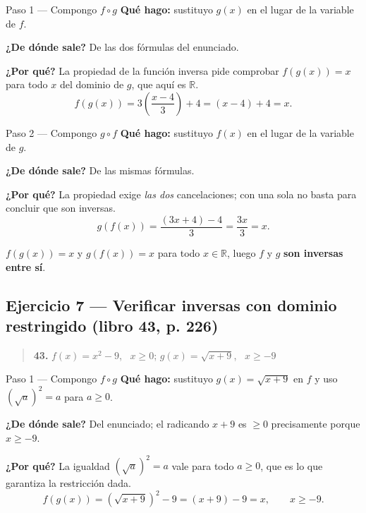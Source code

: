 \documentclass[11pt]{article}
\begin{document}
\begin{paso}{Paso 1 --- Compongo $f\circ g$}
\textbf{Qué hago:} sustituyo $g(x)$ en el lugar de la variable de $f$.

\textbf{¿De dónde sale?} De las dos fórmulas del enunciado.

\textbf{¿Por qué?} La propiedad de la función inversa pide comprobar $f(g(x))=x$ para todo $x$ del dominio de $g$, que aquí es $\mathbb{R}$.
\[
f(g(x))=3\!\left(\frac{x-4}{3}\right)+4=(x-4)+4=x.
\]
\end{paso}

\begin{paso}{Paso 2 --- Compongo $g\circ f$}
\textbf{Qué hago:} sustituyo $f(x)$ en el lugar de la variable de $g$.

\textbf{¿De dónde sale?} De las mismas fórmulas.

\textbf{¿Por qué?} La propiedad exige \emph{las dos} cancelaciones; con una sola no basta para concluir que son inversas.
\[
g(f(x))=\frac{(3x+4)-4}{3}=\frac{3x}{3}=x.
\]
\end{paso}

\begin{resp}
$f(g(x))=x$ y $g(f(x))=x$ para todo $x\in\mathbb{R}$, luego $f$ y $g$ \textbf{son inversas entre sí}.
\end{resp}

\subsection*{Ejercicio 7 --- Verificar inversas con dominio restringido (libro 43, p. 226)}

\begin{quote}
\textbf{43.} $f(x)=x^2-9$, \ $x\ge 0$; \quad $g(x)=\sqrt{x+9}$, \ $x\ge -9$
\end{quote}

\begin{paso}{Paso 1 --- Compongo $f\circ g$}
\textbf{Qué hago:} sustituyo $g(x)=\sqrt{x+9}$ en $f$ y uso $(\sqrt{a})^2=a$ para $a\ge 0$.

\textbf{¿De dónde sale?} Del enunciado; el radicando $x+9$ es $\ge 0$ precisamente porque $x\ge -9$.

\textbf{¿Por qué?} La igualdad $(\sqrt{a})^2=a$ vale para todo $a\ge 0$, que es lo que garantiza la restricción dada.
\[
f(g(x))=\left(\sqrt{x+9}\right)^2-9=(x+9)-9=x, \qquad x\ge -9.
\]
\end{paso}
\end{document}
